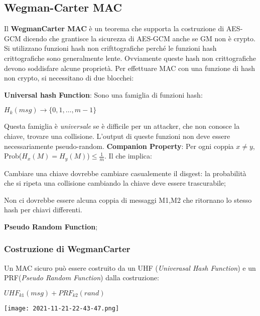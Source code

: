 \documentclass{article}
\theoremstyle{remark}
\begin{document}
\subsection{Wegman-Carter MAC}
Il \textbf{WegmanCarter MAC} è un teorema che supporta la costruzione di AES-GCM dicendo che grantisce la sicurezza di AES-GCM anche se GM non è crypto.
Si utilizzano funzioni hash non crifttografiche perché le funzioni hash crittografiche sono generalmente lente.\newline
Ovviamente queste hash non crittografiche devono soddisfare alcune proprietà. Per effettuare MAC con una funzione di hash non crypto, si necessitano di 
due blocchei:
\begin{itemize}
    \item \textbf{Universal hash Function}:
        Sono una famiglia di funzioni hash:
        \begin{center}
            \(H_k(msg)\rightarrow\{0,1,\dots,m-1\}\)
        \end{center}
        Questa famiglia è \emph{universale} se è difficile per un attacker, che
        non conosce la chiave, trovare una collisione. L'output di queste funzioni non deve essere necessariamente pseudo-random.\newline
        \textbf{Companion Property}: Per ogni coppia \(x\neq y\), Prob(\(H_x(M)=H_y(M)\))\(\leq \frac{1}{m}\). Il che implica:
        \begin{center}
            \item Cambiare una chiave dovrebbe cambiare casualemente il disgest: la probabilità che si ripeta una collisione cambiando la chiave
            deve essere trascurabile;
            \item Non ci dovrebbe essere alcuna coppia di messaggi M1,M2 che ritornano lo stesso hash per chiavi differenti.
        \end{center}
    \item \textbf{Pseudo Random Function};
\end{itemize}
\subsubsection{Costruzione di WegmanCarter}
Un MAC sicuro può essere costruito da un UHF (\emph{Univerasal Hash Function}) e un PRF(\emph{Pseudo Random Function}) dalla costruzione:
\begin{center}
    \(UHF_{k1}(msg)+PRF_{k2}(rand)\)
\end{center}
\begin{center}
    \texttt{[image: 2021-11-21-22-43-47.png]}
\end{center}
\end{document}
